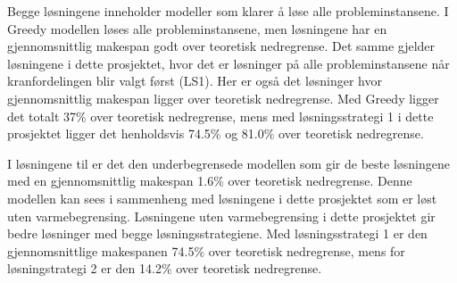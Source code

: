 Begge løsningene inneholder modeller som klarer å løse alle probleminstansene. I Greedy modellen løses alle probleminstansene, men løsningene har en gjennomsnittlig makespan godt over teoretisk nedregrense. Det samme gjelder løsningene i dette prosjektet, hvor det er løsninger på alle probleminstansene når kranfordelingen blir valgt først (LS1). Her er også det løsninger hvor gjennomsnittlig makespan ligger over teoretisk nedregrense. Med Greedy ligger det totalt 37\% over teoretisk nedregrense, mens med løsningsstrategi 1 i dette prosjektet ligger det henholdsvis 74.5\% og 81.0\% over teoretisk nedregrense.

I løsningene til \bht er det den underbegrensede modellen som gir de beste løsningene med en gjennomsnittlig makespan 1.6\% over teoretisk nedregrense. Denne modellen kan sees i sammenheng med løsningene i dette prosjektet som er løst uten varmebegrensing. Løsningene uten varmebegrensing i dette prosjektet gir bedre løsninger med begge løsningsstrategiene. Med løsningsstrategi 1 er den gjennomsnittlige makespanen 74.5\% over teoretisk nedregrense, mens for løsningstrategi 2 er den 14.2\% over teoretisk nedregrense.